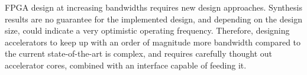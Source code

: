 \newpage
FPGA design at increasing bandwidths requires new design approaches. Synthesis results are no guarantee for the implemented design, and depending on the design size, could indicate a very optimistic operating frequency. Therefore, designing accelerators to keep up with an order of magnitude more bandwidth compared to the current state-of-the-art is complex, and requires carefully thought out accelerator cores, combined with an interface capable of feeding it.


